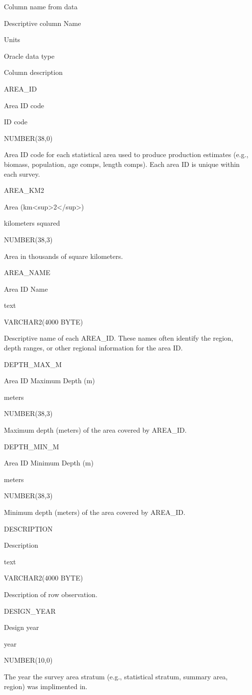 \documentclass[
  letterpaper,
  oneside,
  open=any]{scrbook}
\begin{document}
Column name from data

Descriptive column Name

Units

Oracle data type

Column description

AREA\_ID

Area ID code

ID code

NUMBER(38,0)

Area ID code for each statistical area used to produce production
estimates (e.g., biomass, population, age comps, length comps). Each
area ID is unique within each survey.

AREA\_KM2

Area (km\textless sup\textgreater2\textless/sup\textgreater)

kilometers squared

NUMBER(38,3)

Area in thousands of square kilometers.

AREA\_NAME

Area ID Name

text

VARCHAR2(4000 BYTE)

Descriptive name of each AREA\_ID. These names often identify the
region, depth ranges, or other regional information for the area ID.

DEPTH\_MAX\_M

Area ID Maximum Depth (m)

meters

NUMBER(38,3)

Maximum depth (meters) of the area covered by AREA\_ID.

DEPTH\_MIN\_M

Area ID Minimum Depth (m)

meters

NUMBER(38,3)

Minimum depth (meters) of the area covered by AREA\_ID.

DESCRIPTION

Description

text

VARCHAR2(4000 BYTE)

Description of row observation.

DESIGN\_YEAR

Design year

year

NUMBER(10,0)

The year the survey area stratum (e.g., statistical stratum, summary
area, region) was implimented in.
\end{document}
